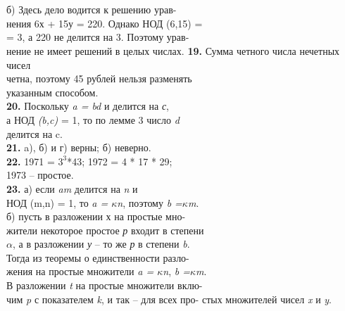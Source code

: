 \begin{minipage}[b]{0.42\textwidth}
	\normalsize \textit \\\\{б) Здесь дело водится к решению урав-\\
	нения 6х + 15у = 220. Однако НОД (6,15) =\\
	= 3, а 220 не делится на 3. Поэтому урав-\\
	нение не имеет решений в целых числах.}
	\hphantom\qquad \textbf{19.} Сумма четного числа нечетных чисел\\
	четна, поэтому 45 рублей нельзя разменять\\
	указанным способом.\\
	\hphantom\qquad \textbf{20.} Поскольку \textit{a = bd} и делится на \textit{с},\\
	а НОД \textit{(b,c)} = 1, то по лемме 3 число \textit{d}\\
	делится на c.\\
	\hphantom\qquad \textbf{21.} a), б) и г) верны; б) неверно.\\
	\hphantom\qquad \textbf{22.} 1971 = $3^3$*43; 1972 = 4 * 17 * 29;\\
	1973 -- простое.\\
	\hphantom\qquad \textbf{23.} а) если \textit{am}  делится на \textit{n} и\\
	НОД (m,n) = 1, то \textit{a = $\kappa$n}, поэтому \textit{b =$\kappa$m}.\\
	\hphantom\qquad б) пусть в разложении х на простые мно-\\
	жители некоторое простое \textit{р} входит в степени\\
	\textit{$\alpha$}, а в разложении \textit{у} -- то же \textit{р} в степени \textit{b}.\\
	Тогда из теоремы о единственности разло-\\
	жения на простые множители  \textit{a = $\kappa$n},  \textit{b =$\kappa$m}.\\
	В разложении \textit{t} на простые множители вклю-\\
	чим \textit{p} с показателем \textit{k}, и так  -- для всех про-
	стых множителей чисел \textit{x} и \textit{y}.\\
		
\end{minipage}
